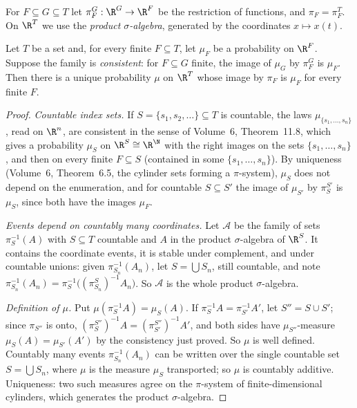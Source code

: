 For $F\subseteq G\subseteq T$ let $\pi^G_F:\R^G\to\R^F$ be the restriction of functions, and $\pi_F=\pi^T_F$. On $\R^T$ we use the \emph{product $\sigma$-algebra}, generated by the coordinates
$x\mapsto x(t)$.

\begin{theorem}\label{thm:kolmext}
Let $T$ be a set and, for every finite $F\subseteq T$, let $\mu_F$ be a probability on $\R^F$. Suppose the family is \emph{consistent}: for $F\subseteq G$ finite, the image of $\mu_G$ by $\pi^G_F$ is $\mu_F$.
Then there is a unique probability $\mu$ on $\R^T$ whose image by $\pi_F$ is $\mu_F$ for every finite $F$.
\end{theorem}

\begin{proof}
\emph{Countable index sets.} If $S=\{s_1,s_2,\dots\}\subseteq T$ is countable, the laws $\mu_{\{s_1,\dots,s_n\}}$, read on $\R^n$, are consistent in the sense of Volume~6, Theorem~11.8, which gives a probability $\mu_S$ on
$\R^S\cong\R^\N$ with the right images on the sets $\{s_1,\dots,s_n\}$, and then on every finite $F\subseteq S$ (contained in some $\{s_1,\dots,s_n\}$). By uniqueness (Volume~6, Theorem~6.5, the cylinder sets
forming a $\pi$-system), $\mu_S$ does not depend on the enumeration, and for countable $S\subseteq S'$ the image of $\mu_{S'}$ by $\pi^{S'}_S$ is $\mu_S$, since both have the images $\mu_F$.

\emph{Events depend on countably many coordinates.} Let $\mathcal A$ be the family of sets $\pi_S^{-1}(A)$ with $S\subseteq T$ countable and $A$ in the product $\sigma$-algebra of $\R^S$. It contains the
coordinate events, it is stable under complement, and under countable unions: given $\pi_{S_n}^{-1}(A_n)$, let $S=\bigcup S_n$, still countable, and note $\pi_{S_n}^{-1}(A_n)=\pi_S^{-1}\bigl((\pi^S_{S_n})^{-1}A_n\bigr)$.
So $\mathcal A$ is the whole product $\sigma$-algebra.

\emph{Definition of $\mu$.} Put $\mu(\pi_S^{-1}A)=\mu_S(A)$. If $\pi_S^{-1}A=\pi_{S'}^{-1}A'$, let $S''=S\cup S'$; since $\pi_{S''}$ is onto, $(\pi^{S''}_S)^{-1}A=(\pi^{S''}_{S'})^{-1}A'$, and both sides have
$\mu_{S''}$-measure $\mu_S(A)=\mu_{S'}(A')$ by the consistency just proved. So $\mu$ is well defined. Countably many events $\pi_{S_n}^{-1}(A_n)$ can be written over the single countable set
$S=\bigcup S_n$, where $\mu$ is the measure $\mu_S$ transported; so $\mu$ is countably additive. Uniqueness: two such measures agree on the $\pi$-system of finite-dimensional cylinders, which
generates the product $\sigma$-algebra.
\end{proof}

